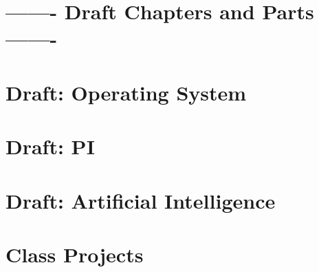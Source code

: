 \documentclass{format/laszewski}
\begin{document}




\part{------- Draft Chapters and Parts -------}





\part{Draft: Operating System}


\part{Draft: PI}





\part{Draft: Artificial Intelligence}




\begin{comment}






\end{comment}

%



% 

\part{Class Projects}







\begin{comment}

\part{Appendix}



\end{comment}
\end{document}
